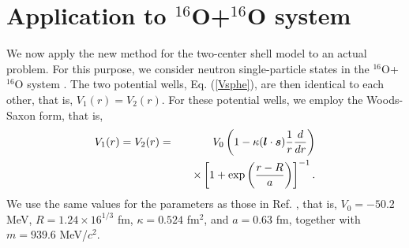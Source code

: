 \documentclass[superscriptaddress,twocolumn,amsmath,amssymb]{revtex4}
\renewcommand{\vec}[1]{\mbox{\boldmath $#1$}}
\begin{document}
\section{Application to $^{16}$O+$^{16}$O system}

We now apply the new method for the two-center shell model to an actual 
problem. For this purpose, we consider neutron single-particle states 
in the $^{16}$O+$^{16}$O system \cite{Diaz-Torres07,ZM76,GGR77}. 
The two potential wells, Eq. (\ref{Vsphe}), 
are then identical to each other, that is, $V_1(r)=V_2(r)$. 
For these potential wells, we employ the Woods-Saxon form, that is, 
%
\begin{eqnarray}
V_1(r)=V_2(r)&=&V_0\left(1-\kappa(\vec{l}\cdot\vec{s})
\frac{1}{r}\frac{d}{dr}\right)\nonumber \\
&&~~~\times \left[1+\exp\left(\frac{r-R}{a}\right)\right]^{-1}. 
\label{eq:WS}
\end{eqnarray}
%
We use the same values for the parameters as those in 
Ref. \cite{MR86}, that is, $V_0=-50.2$ MeV, $R=1.24\times 16^{1/3}$ fm, 
$\kappa=0.524$ fm$^2$,  
and $a=0.63$ fm, together with $m=939.6$ MeV/$c^2$. 
\end{document}
